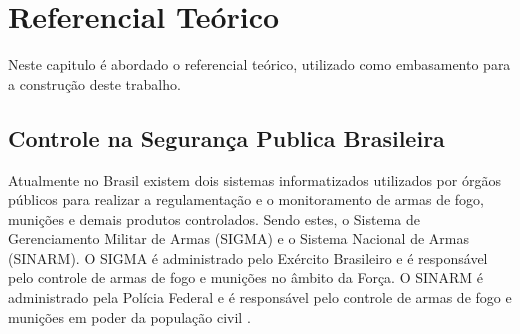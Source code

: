 
 
\chapter{Referencial Teórico}\label{referecial_teorico}

Neste capitulo é abordado o referencial teórico, utilizado como embasamento para a construção deste trabalho.
\section{ Controle na Segurança Publica Brasileira }
Atualmente no Brasil existem dois sistemas informatizados utilizados por órgãos públicos para realizar a regulamentação e o monitoramento de armas de fogo, munições e demais produtos controlados.
Sendo estes, o Sistema de Gerenciamento Militar de Armas (SIGMA) e o Sistema Nacional de Armas (SINARM). O SIGMA é administrado pelo Exército Brasileiro e é responsável pelo controle de armas de fogo e munições no âmbito da Força. O SINARM é administrado pela Polícia Federal e é responsável pelo controle de armas de fogo e munições em poder da população civil \cite{shotEntendaSinarm}.

